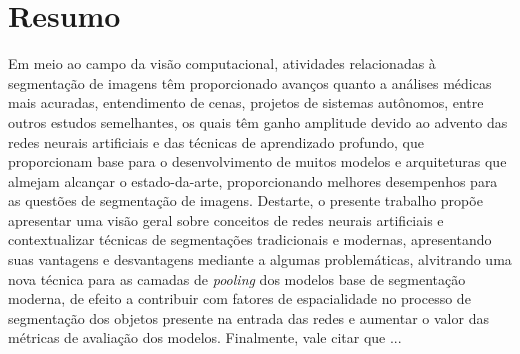 \section*{Resumo}
\thispagestyle{empty}
\makeatletter
\newcommand*{\rom}[1]{\expandafter\@slowromancap\romannumeral #1@}
\makeatother
Em meio ao campo da visão computacional, atividades relacionadas à segmentação de imagens têm proporcionado avanços quanto a análises médicas mais acuradas, entendimento de cenas, projetos de sistemas autônomos, entre outros estudos semelhantes, os quais têm ganho amplitude devido ao advento das redes neurais artificiais e das técnicas de aprendizado profundo, que proporcionam base para o desenvolvimento de muitos modelos e arquiteturas que almejam alcançar o estado-da-arte, proporcionando melhores desempenhos para as questões de segmentação de imagens.
Destarte, o presente trabalho propõe apresentar uma visão geral sobre conceitos de redes neurais artificiais e contextualizar técnicas de segmentações tradicionais e modernas, apresentando suas vantagens e desvantagens mediante a algumas problemáticas, alvitrando uma nova técnica para as camadas de \textit{pooling} dos modelos base de segmentação moderna, de efeito a contribuir com fatores de espacialidade no processo de segmentação dos objetos presente na entrada das redes e aumentar o valor das métricas de avaliação dos modelos.
Finalmente, vale citar que ...